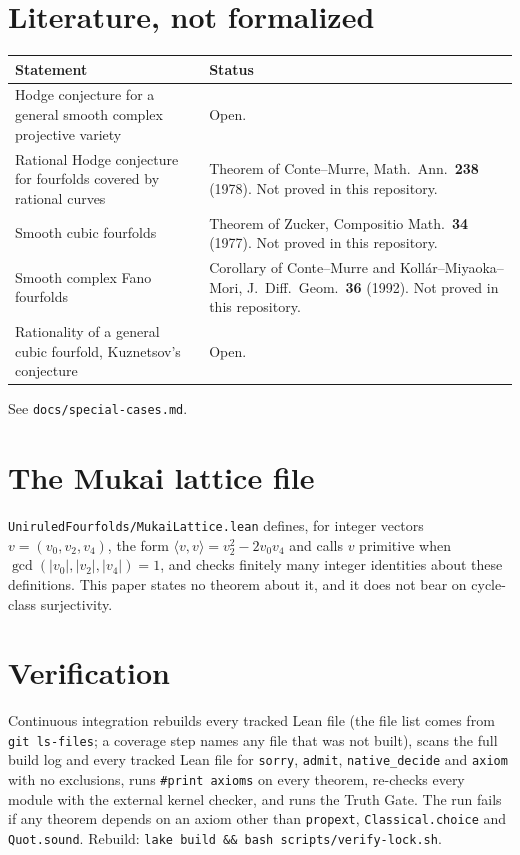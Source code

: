 \documentclass[11pt,a4paper]{article}
\theoremstyle{definition}
\begin{document}
\section{Literature, not formalized}
\begin{center}
\small
\begin{tabular}{p{}p{}}
\toprule
\textbf{Statement} & \textbf{Status} \\
\midrule
Hodge conjecture for a general smooth complex projective variety & Open. \\
Rational Hodge conjecture for fourfolds covered by rational curves & Theorem of Conte--Murre, Math.\ Ann.\ \textbf{238} (1978). Not proved in this repository. \\
Smooth cubic fourfolds & Theorem of Zucker, Compositio Math.\ \textbf{34} (1977). Not proved in this repository. \\
Smooth complex Fano fourfolds & Corollary of Conte--Murre and Koll\'ar--Miyaoka--Mori, J.\ Diff.\ Geom.\ \textbf{36} (1992). Not proved in this repository. \\
Rationality of a general cubic fourfold, Kuznetsov's conjecture & Open. \\
\bottomrule
\end{tabular}
\end{center}
See \texttt{docs/special-cases.md}.

\section{The Mukai lattice file}
\texttt{UniruledFourfolds/MukaiLattice.lean} defines, for integer vectors $v=(v_0,v_2,v_4)$, the form $\langle v,v\rangle=v_2^2-2v_0v_4$ and calls $v$ primitive when $\gcd(|v_0|,|v_2|,|v_4|)=1$, and checks finitely many integer identities about these definitions. This paper states no theorem about it, and it does not bear on cycle-class surjectivity.

\section{Verification}
Continuous integration rebuilds every tracked Lean file (the file list comes from \texttt{git ls-files}; a coverage step names any file that was not built), scans the full build log and every tracked Lean file for \texttt{sorry}, \texttt{admit}, \texttt{native\_decide} and \texttt{axiom} with no exclusions, runs \texttt{\#print axioms} on every theorem, re-checks every module with the external kernel checker, and runs the Truth Gate. The run fails if any theorem depends on an axiom other than \texttt{propext}, \texttt{Classical.choice} and \texttt{Quot.sound}. Rebuild: \texttt{lake build \&\& bash scripts/verify-lock.sh}.
\end{document}
